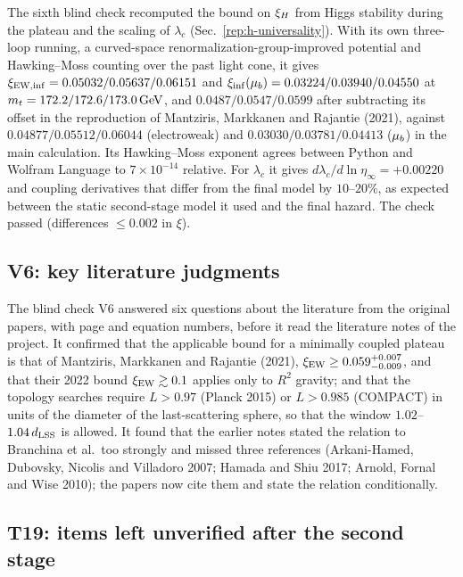 The sixth blind check recomputed the bound on $\xi_H$ from Higgs stability during the plateau and the scaling of $\lambda_c$ (Sec.~\ref{rep:h-universality}).
With its own three-loop running, a curved-space renormalization-group-improved potential and Hawking--Moss counting over the past light cone, it gives $\xi_{\rm EW,inf}=0.05032/\allowbreak 0.05637/\allowbreak 0.06151$ and $\xi_{\rm inf}(\mu_b)=0.03224/\allowbreak 0.03940/\allowbreak 0.04550$ at $m_t=172.2/\allowbreak 172.6/\allowbreak 173.0\,\mathrm{GeV}$, and $0.0487/\allowbreak 0.0547/\allowbreak 0.0599$ after subtracting its offset in the reproduction of Mantziris, Markkanen and Rajantie (2021), against $0.04877/\allowbreak 0.05512/\allowbreak 0.06044$ (electroweak) and $0.03030/\allowbreak 0.03781/\allowbreak 0.04413$ ($\mu_b$) in the main calculation. %
Its Hawking--Moss exponent agrees between Python and Wolfram Language to $7\times10^{-14}$ relative. %
For $\lambda_c$ it gives $d\lambda_c/d\ln\eta_\infty=+0.00220$ and coupling derivatives that differ from the final model by $10$--$20\%$, as expected between the static second-stage model it used and the final hazard. %
The check passed (differences $\le0.002$ in $\xi$).

\subsection{V6: key literature judgments}\label{sec:v19-v6}

The blind check V6 answered six questions about the literature from the original papers, with page and equation numbers, before it read the literature notes of the project.
It confirmed that the applicable bound for a minimally coupled plateau is that of Mantziris, Markkanen and Rajantie (2021), $\xi_{\rm EW}\ge0.059^{+0.007}_{-0.009}$, and that their 2022 bound $\xi_{\rm EW}\gtrsim0.1$ applies only to $R^2$ gravity; and that the topology searches require $L>0.97$ (Planck 2015) or $L>0.985$ (COMPACT) in units of the diameter of the last-scattering sphere, so that the window $1.02$--$1.04\,d_{\mathrm{LSS}}$ is allowed. %
It found that the earlier notes stated the relation to Branchina et al.\ too strongly and missed three references (Arkani-Hamed, Dubovsky, Nicolis and Villadoro 2007; Hamada and Shiu 2017; Arnold, Fornal and Wise 2010); the papers now cite them and state the relation conditionally. %

\subsection{T19: items left unverified after the second stage}\label{sec:v19-t19}

